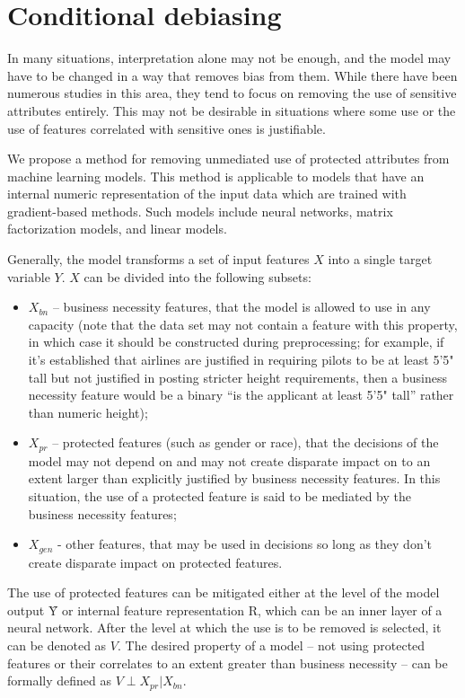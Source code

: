 \chapter{Conditional debiasing}

In many situations, interpretation alone may not be enough, and the model may
have to be changed in a way that removes bias from them. While there have been
numerous studies in this area, they tend to focus on removing the use of
sensitive attributes entirely. This may not be desirable in situations where
some use or the use of features correlated with sensitive ones is justifiable.

We propose a method for removing unmediated use of protected attributes from
machine learning models. This method is applicable to models that have an
internal numeric representation of the input data which are trained with
gradient-based methods. Such models include neural networks, matrix
factorization models, and linear models.

Generally, the model transforms a set of input features $X$ into a single target
variable $Y$. $X$ can be divided into the following subsets:

\begin{itemize}
	\item
		$X_{bn}$ -- business necessity features, that the model is
		allowed to use in any capacity (note that the data set may not
		contain a feature with this property, in which case it should be
		constructed during preprocessing; for example, if it’s
		established that airlines are justified in requiring pilots to
		be at least 5'5" tall but not justified in posting stricter
		height requirements, then a business necessity feature would be
		a binary ``is the applicant at least 5'5" tall'' rather than
		numeric height);
	\item
		$X_{pr}$ -- protected features (such as gender or race), that
		the decisions of the model may not depend on and may not create
		disparate impact on to an extent larger than explicitly 
		justified by business necessity features. In this situation, the
		use of a protected feature is said to be mediated by the
		business necessity features;
	\item
		$X_{gen}$ - other features, that may be used in decisions so
		long as they don’t create disparate impact on protected features.
\end{itemize}

The use of protected features can be mitigated either at the level of the model
output $Ŷ$ or internal feature representation R, which can be an inner layer of a
neural network. After the level at which the use is to be removed is selected,
it can be denoted as $V$. The desired property of a model -- not using protected
features or their correlates to an extent greater than business necessity -- can
be formally defined as $V\perp X_{pr}|X_{bn}$.

